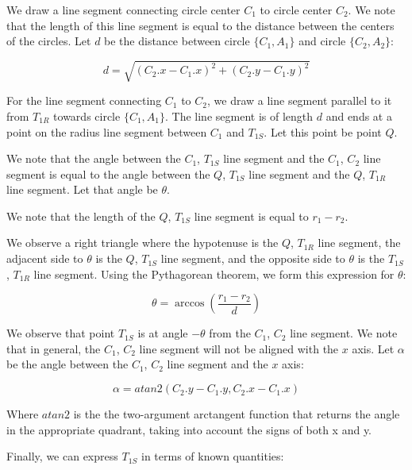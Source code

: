 \documentclass{article}
\begin{document}
We draw a line segment connecting circle center $C_1$ to circle center $C_2$. We note that the length of this line segment is equal to the distance between the centers of the circles. Let $d$ be the distance between circle $\{C_1, A_1\}$ and circle $\{C_2, A_2\}$:

\begin{equation}
    \label{eq:d}
    d = \sqrt{(C_2.x - C_1.x)^2 + (C_2.y - C_1.y)^2}
\end{equation}

For the line segment connecting $C_1$ to $C_2$, we draw a line segment parallel to it from $T_{1R}$ towards circle $\{C_1, A_1\}$. The line segment is of length $d$ and ends at a point on the radius line segment between $C_1$ and $T_{1S}$. Let this point be point $Q$.

We note that the angle between the $C_1$, $T_{1S}$ line segment and the $C_1$, $C_2$ line segment is equal to the angle between the $Q$, $T_{1S}$ line segment and the $Q$, $T_{1R}$ line segment. Let that angle be $\theta$.

We note that the length of the $Q$, $T_{1S}$ line segment is equal to $r_1 - r_2$.

We observe a right triangle where the hypotenuse is the $Q$, $T_{1R}$ line segment, the adjacent side to $\theta$ is the $Q$, $T_{1S}$ line segment, and the opposite side to $\theta$ is the $T_{1S}$,  $T_{1R}$ line segment. Using the Pythagorean theorem, we form this expression for $\theta$:

\begin{equation}
    \label{eq:theta}
    \theta = \arccos\left(\frac{r_1 - r_2}{d}\right)
\end{equation} 

We observe that point $T_{1S}$ is at angle $-\theta$ from the $C_1$, $C_2$ line segment. We note that in general, the $C_1$, $C_2$ line segment will not be aligned with the $x$ axis. Let $\alpha$ be the angle between the $C_1$, $C_2$ line segment and the $x$ axis:

\begin{equation}
    \label{eq:alpha}
    \alpha = atan2(C_2.y - C_1.y, C_2.x - C_1.x)
\end{equation}     

Where $atan2$ is the the two-argument arctangent function that returns the angle in the appropriate quadrant, taking into account the signs of both x and y.

Finally, we can express $T_{1S}$ in terms of known quantities:
\end{document}
